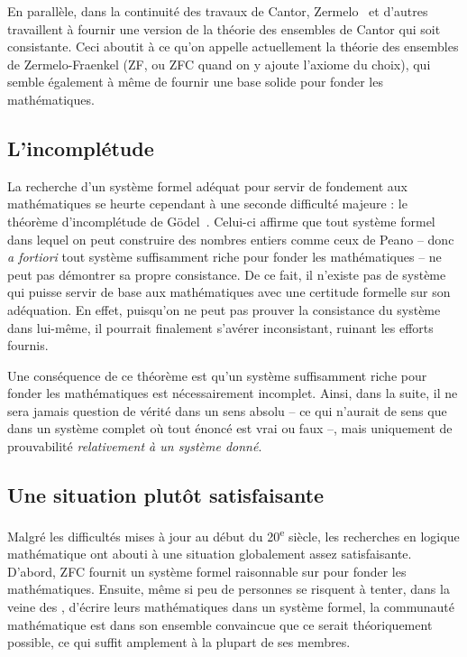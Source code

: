 En parallèle, dans la continuité des travaux de Cantor,
Zermelo~ et
d’autres travaillent à fournir une version de la théorie des ensembles de Cantor
qui soit consistante. Ceci aboutit à ce qu’on appelle actuellement la
théorie des ensembles de Zermelo-Fraenkel (ZF, ou ZFC quand on y ajoute l’axiome
du choix), qui semble également à même de fournir une base solide pour fonder les
mathématiques.

\subsection{L’incomplétude}

La recherche d’un système formel adéquat pour servir de fondement aux mathématiques 
se heurte cependant à une seconde difficulté majeure : le théorème d’incomplétude de
Gödel~. Celui-ci affirme que tout système formel
dans lequel on peut construire des nombres entiers comme ceux de Peano – donc
\textit{a fortiori} tout système suffisamment riche pour fonder les mathématiques –
ne peut pas démontrer sa propre consistance. De ce fait, il n’existe pas de
système qui puisse servir de base aux mathématiques
avec une certitude formelle sur son adéquation.
En effet, puisqu’on ne peut pas prouver la consistance du
système dans lui-même, il pourrait finalement s’avérer inconsistant, ruinant les
efforts fournis.

Une conséquence de ce théorème est qu’un système suffisamment riche
pour fonder les mathématiques est nécessairement incomplet.%
Ainsi, dans la suite, il ne sera jamais question de vérité dans un sens absolu –
ce qui n’aurait de sens que dans un système complet
où tout énoncé est vrai ou faux –, mais
uniquement de prouvabilité \emph{relativement à un système donné}.

\subsection{Une situation plutôt satisfaisante}

Malgré les difficultés mises à jour au début du 20\textsuperscript{e}
siècle, les recherches en logique mathématique ont abouti à une situation
globalement assez satisfaisante. D’abord, ZFC fournit un système formel raisonnable sur
pour fonder les mathématiques. Ensuite, même si peu de
personnes se risquent à tenter, dans la veine des ,
d’écrire leurs mathématiques dans un système formel,
la communauté mathématique est dans son ensemble convaincue que ce serait théoriquement
possible, ce qui suffit amplement à la plupart de ses membres.

